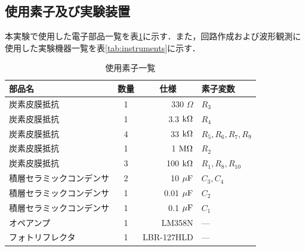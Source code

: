 \subsection{使用素子及び実験装置}

本実験で使用した電子部品一覧を表\ref{tab:circuit_components}に示す．また，回路作成および波形観測に使用した実験機器一覧を表\ref{tab:instruments}に示す．

\begin{table}[htbp]
  \caption{使用素子一覧}
  \centering
  \small
  \setlength{\tabcolsep}{5pt}
  \begin{tabular}{|l|c|r|l|}
    \hline
    部品名          & 数量 & \multicolumn{1}{c|}{仕様} & 素子変数                 \\
    \hline\hline
    炭素皮膜抵抗       & 1  & 330 $\Omega$            & $R_3$                \\
    \hline
    炭素皮膜抵抗       & 1  & 3.3 $\rm{k}\Omega$      & $R_4$                \\
    \hline
    炭素皮膜抵抗       & 4  & 33 $\rm{k}\Omega$       & $R_5, R_6, R_7, R_9$ \\
    \hline
    炭素皮膜抵抗       & 1  & 1 $\rm{M}\Omega$        & $R_2$                \\
    \hline
    炭素皮膜抵抗       & 3  & 100 $\rm{k}\Omega$      & $R_1, R_8, R_{10}$   \\
    \hline
    積層セラミックコンデンサ & 2  & 10 $\mu\rm{F}$          & $C_3, C_4$           \\
    \hline
    積層セラミックコンデンサ & 1  & 0.01 $\mu\rm{F}$        & $C_2$                \\
    \hline
    積層セラミックコンデンサ & 1  & 0.1 $\mu\rm{F}$         & $C_1$                \\
    \hline
    オペアンプ        & 1  & LM358N                  & ---                  \\
    \hline
    フォトリフレクタ     & 1  & LBR-127HLD              & ---                  \\
    \hline
  \end{tabular}
  \label{tab:circuit_components}
\end{table}


